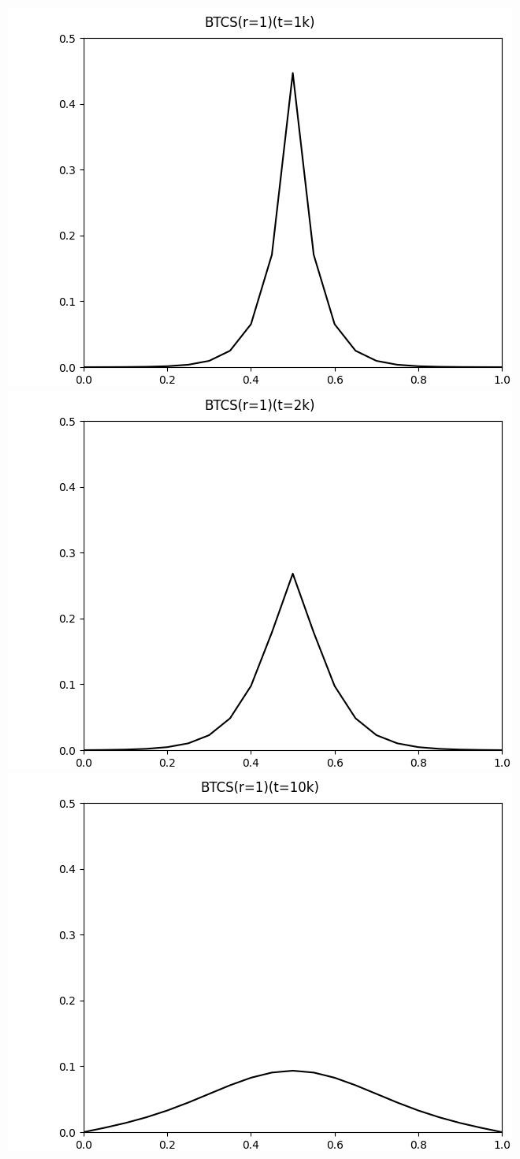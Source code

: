 \documentclass[12pt]{ctexart}
\begin{document}
\includegraphics[scale=0.35]{BTCS(r=1)(t=1k).jpg}
\includegraphics[scale=0.35]{BTCS(r=1)(t=2k).jpg}
\includegraphics[scale=0.35]{BTCS(r=1)(t=10k).jpg}
\end{document}
